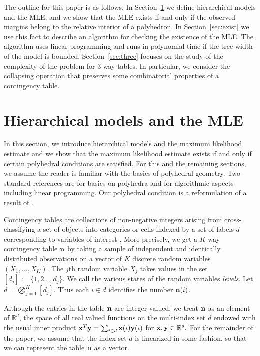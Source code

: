 \documentclass{elsart}
\begin{document}
The outline for this paper is as follows.  In Section~\ref{sec:hier} we define
hierarchical models and the MLE, and we show that the MLE 
exists if and only if the observed margins belong to the relative
interior of a polyhedron. In Section~\ref{sec:exist} we use this fact
to describe an algorithm for checking the existence of the MLE.  The
algorithm uses linear programming and runs in polynomial time if the
tree width of the model is bounded.  Section~\ref{sec:three} focuses
on the study of the complexity of the problem for 3-way
tables. In particular, we consider the collapsing operation that preserves 
some combinatorial properties of a contingency table.



\section{Hierarchical models and the MLE}\label{sec:hier}

In this section, we introduce hierarchical models and the maximum
likelihood estimate and we show that the maximum likelihood estimate
exists if and only if certain polyhedral conditions are satisfied.
For this and the remaining sections, we assume the reader is familiar
with the basics of polyhedral geometry.  Two standard references are
\citet{ziegler} for basics on polyhedra and \citet{SCH98} for
algorithmic aspects including linear programming.  Our polyhedral
condition is a reformulation of a result of \citet{HAB74}.

Contingency tables are collections of non-negative integers arising
from cross-classifying a set of objects into  categories or cells
indexed by a set of labels $d$ corresponding to variables of interest 
\citep[see][]{BFH75,LAU96}.
More precisely, we get a $K$-way contingency table ${\bf n}$
by taking a sample of independent and identically distributed observations 
on  a vector of $K$ discrete random variables 
$(X_1, \ldots, X_K) $. The $j$th random variable $X_j$ takes values in the
set $[d_j] := \{1,2 \ldots, d_j\}$.  We call the various states of the random variables
\emph{levels}.   Let $d = \bigotimes_{j=1}^K [d_j]$. Thus each $i \in d$ identifies the
number ${\bf n}(i)$.  

Although the entries in the table ${\bf n}$ are integer-valued, we treat ${\bf n}$ 
 as an element of $\mathbb{R} ^ {d}$, the space of all real valued
functions on the multi-index set $d$ endowed with the usual inner
product
${\bf x}^{T}{\bf y} = \sum_{i \in d} {\bf x}(i) {\bf y}(i)$ for
${\bf  x},{\bf y} \in \mathbb{R} ^ {d}.$
For the remainder of the paper, we assume that the index set $d$
is linearized in some fashion, so that we can represent the table ${\bf n}$
 as a vector.
\end{document}
